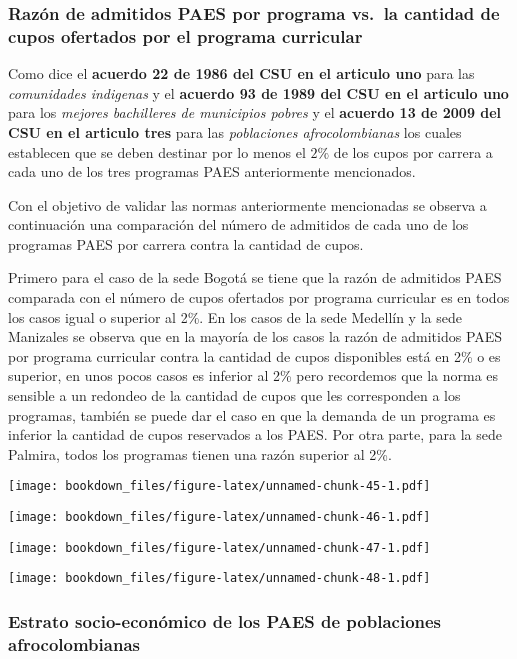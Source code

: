 \documentclass[]{article}
\theoremstyle{definition}
\theoremstyle{definition}
\theoremstyle{definition}
\theoremstyle{remark}
\begin{document}
\subsubsection{Razón de admitidos PAES por programa vs.~la cantidad de
cupos ofertados por el programa
curricular}\label{razon-de-admitidos-paes-por-programa-vs.la-cantidad-de-cupos-ofertados-por-el-programa-curricular}

Como dice el \textbf{acuerdo 22 de 1986 del CSU en el articulo uno} para
las \emph{comunidades indigenas} y el \textbf{acuerdo 93 de 1989 del CSU
en el articulo uno} para los \emph{mejores bachilleres de municipios
pobres} y el \textbf{acuerdo 13 de 2009 del CSU en el articulo tres}
para las \emph{poblaciones afrocolombianas} los cuales establecen que se
deben destinar por lo menos el \(2\%\) de los cupos por carrera a cada
uno de los tres programas PAES anteriormente mencionados.

Con el objetivo de validar las normas anteriormente mencionadas se
observa a continuación una comparación del número de admitidos de cada
uno de los programas PAES por carrera contra la cantidad de cupos.

Primero para el caso de la sede Bogotá se tiene que la razón de
admitidos PAES comparada con el número de cupos ofertados por programa
curricular es en todos los casos igual o superior al 2\%. En los casos
de la sede Medellín y la sede Manizales se observa que en la mayoría de
los casos la razón de admitidos PAES por programa curricular contra la
cantidad de cupos disponibles está en 2\% o es superior, en unos pocos
casos es inferior al 2\% pero recordemos que la norma es sensible a un
redondeo de la cantidad de cupos que les corresponden a los programas,
también se puede dar el caso en que la demanda de un programa es
inferior la cantidad de cupos reservados a los PAES. Por otra parte,
para la sede Palmira, todos los programas tienen una razón superior al
2\%.

\texttt{[image: bookdown\_files/figure-latex/unnamed-chunk-45-1.pdf]}

\texttt{[image: bookdown\_files/figure-latex/unnamed-chunk-46-1.pdf]}

\texttt{[image: bookdown\_files/figure-latex/unnamed-chunk-47-1.pdf]}

\texttt{[image: bookdown\_files/figure-latex/unnamed-chunk-48-1.pdf]}

\subsubsection{Estrato socio-económico de los PAES de poblaciones
afrocolombianas}\label{estrato-socio-economico-de-los-paes-de-poblaciones-afrocolombianas}
\end{document}
